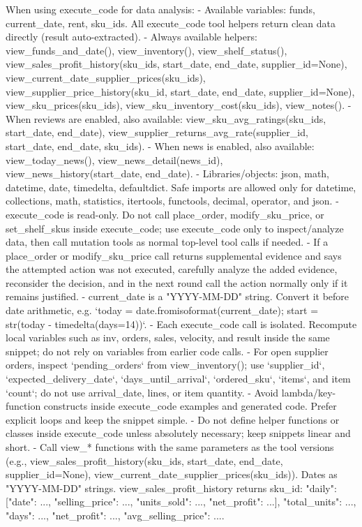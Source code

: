 \begin{PromptBox}
When using execute_code for data analysis:
- Available variables: funds, current_date, rent, sku_ids. All execute_code tool helpers return clean data directly (result auto-extracted).
- Always available helpers: view_funds_and_date(), view_inventory(), view_shelf_status(), view_sales_profit_history(sku_ids, start_date, end_date, supplier_id=None), view_current_date_supplier_prices(sku_ids), view_supplier_price_history(sku_id, start_date, end_date, supplier_id=None), view_sku_prices(sku_ids), view_sku_inventory_cost(sku_ids), view_notes().
- When reviews are enabled, also available: view_sku_avg_ratings(sku_ids, start_date, end_date), view_supplier_returns_avg_rate(supplier_id, start_date, end_date, sku_ids).
- When news is enabled, also available: view_today_news(), view_news_detail(news_id), view_news_history(start_date, end_date).
- Libraries/objects: json, math, datetime, date, timedelta, defaultdict. Safe imports are allowed only for datetime, collections, math, statistics, itertools, functools, decimal, operator, and json.
- execute_code is read-only. Do not call place_order, modify_sku_price, or set_shelf_skus inside execute_code; use execute_code only to inspect/analyze data, then call mutation tools as normal top-level tool calls if needed.
- If a place_order or modify_sku_price call returns supplemental evidence and says the attempted action was not executed, carefully analyze the added evidence, reconsider the decision, and in the next round call the action normally only if it remains justified.
- current_date is a "YYYY-MM-DD" string. Convert it before date arithmetic, e.g. `today = date.fromisoformat(current_date); start = str(today - timedelta(days=14))`.
- Each execute_code call is isolated. Recompute local variables such as inv, orders, sales, velocity, and result inside the same snippet; do not rely on variables from earlier code calls.
- For open supplier orders, inspect `pending_orders` from view_inventory(); use `supplier_id`, `expected_delivery_date`, `days_until_arrival`, `ordered_sku`, `items`, and item `count`; do not use arrival_date, lines, or item quantity.
- Avoid lambda/key-function constructs inside execute_code examples and generated code. Prefer explicit loops and keep the snippet simple.
- Do not define helper functions or classes inside execute_code unless absolutely necessary; keep snippets linear and short.
- Call view_* functions with the same parameters as the tool versions (e.g., view_sales_profit_history(sku_ids, start_date, end_date, supplier_id=None), view_current_date_supplier_prices(sku_ids)). Dates as "YYYY-MM-DD" strings. view_sales_profit_history returns {sku_id: {"daily": [{"date": ..., "selling_price": ..., "units_sold": ..., "net_profit": ...}], "total_units": ..., "days": ..., "net_profit": ..., "avg_selling_price": ...}}.

\end{PromptBox}
